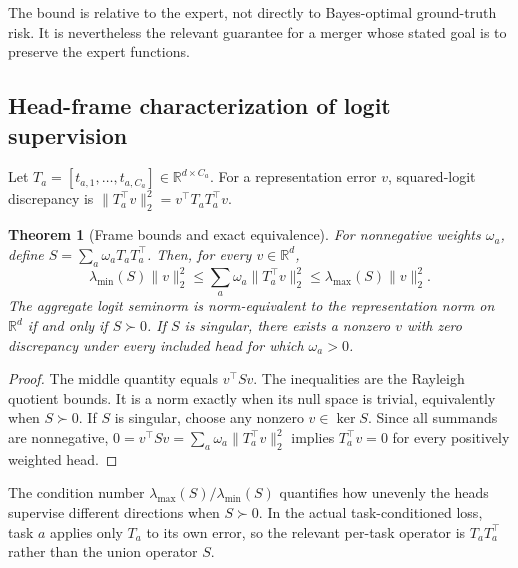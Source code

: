 \documentclass[letterpaper]{article} %
\theoremstyle{plain}
\newtheorem{theorem}{Theorem}
\theoremstyle{definition}
\begin{document}
The bound is relative to the expert, not directly to Bayes-optimal ground-truth risk.
It is nevertheless the relevant guarantee for a merger whose stated goal is to preserve the expert functions.

\subsection{Head-frame characterization of logit supervision}
\label{app:head-frame}

Let $T_a=[t_{a,1},\ldots,t_{a,C_a}]\in\mathbb R^{d\times C_a}$.
For a representation error $v$, squared-logit discrepancy is $\|T_a^\top v\|_2^2=v^\top T_aT_a^\top v$.

\begin{theorem}[Frame bounds and exact equivalence]
\label{thm:frame}
For nonnegative weights $\omega_a$, define $S=\sum_a\omega_aT_aT_a^\top$.
Then, for every $v\in\mathbb R^d$,
\begin{equation}
\lambda_{\min}(S)\|v\|_2^2
\le\sum_a\omega_a\|T_a^\top v\|_2^2
\le\lambda_{\max}(S)\|v\|_2^2.
\label{eq:frame-bounds}
\end{equation}
The aggregate logit seminorm is norm-equivalent to the representation norm on $\mathbb R^d$ if and only if $S\succ0$.
If $S$ is singular, there exists a nonzero $v$ with zero discrepancy under every included head for which $\omega_a>0$.
\end{theorem}

\begin{proof}
The middle quantity equals $v^\top Sv$.
The inequalities are the Rayleigh quotient bounds.
It is a norm exactly when its null space is trivial, equivalently when $S\succ0$.
If $S$ is singular, choose any nonzero $v\in\ker S$.
Since all summands are nonnegative, $0=v^\top Sv=\sum_a\omega_a\|T_a^\top v\|_2^2$ implies $T_a^\top v=0$ for every positively weighted head.
\end{proof}

The condition number $\lambda_{\max}(S)/\lambda_{\min}(S)$ quantifies how unevenly the heads supervise different directions when $S\succ0$.
In the actual task-conditioned loss, task $a$ applies only $T_a$ to its own error, so the relevant per-task operator is $T_aT_a^\top$ rather than the union operator $S$.
\end{document}
